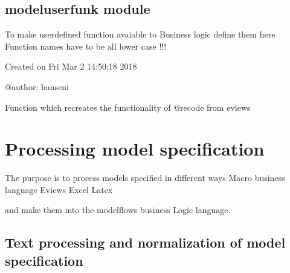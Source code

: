\documentclass[letterpaper,10pt,english]{sphinxmanual}
\begin{document}
\sphinxstepscope


\subsection{modeluserfunk module}
\label{\detokenize{core/modeluserfunk:module-modeluserfunk}}\label{\detokenize{core/modeluserfunk:modeluserfunk-module}}\label{\detokenize{core/modeluserfunk::doc}}
\sphinxAtStartPar
To make userdefined function avaiable to Business logic define them here
Function names have to be all lower case !!!

\sphinxAtStartPar
Created on Fri Mar  2 14:50:18 2018

\sphinxAtStartPar
@author: hanseni

\begin{fulllineitems}
\label{\detokenize{core/modeluserfunk:modeluserfunk.recode}}
\pysigstartsignatures
{}
\pysigstopsignatures
\sphinxAtStartPar
Function which recreates the functionality of @recode from eviews

\end{fulllineitems}


\sphinxstepscope


\section{Processing model specification}
\label{\detokenize{onboard/onboard:processing-model-specification}}\label{\detokenize{onboard/onboard::doc}}
\sphinxAtStartPar
The purpose is to process models specified in different ways
\sphinxhyphen{} Macro business language
\sphinxhyphen{} Eviews
\sphinxhyphen{} Excel
\sphinxhyphen{} Latex

\sphinxAtStartPar
and make them into the modelflows business Logic language.


\subsection{Text processing and normalization of model specification}
\label{\detokenize{onboard/onboard:text-processing-and-normalization-of-model-specification}}
\sphinxstepscope
\end{document}
